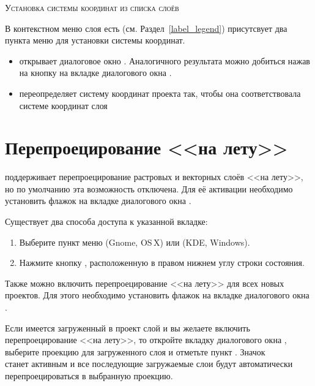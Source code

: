 \begin{Tip}
\caption{\textsc{Установка системы координат из списка слоёв}} В контекстном
меню слоя есть (см. Раздел~\ref{label_legend}) присутсвует два пункта меню
для установки системы координат.
\begin{itemize}
\item {} открывает диалоговое окно
 . Аналогичного результата можно добиться
 нажав на кнопку  на вкладке 
 диалогового окна .
\item {} переопределяет
систему координат проекта так, чтобы она соответствовала системе координат
слоя
\end{itemize}
\end{Tip}

\section{Перепроецирование <<на лету>>}\label{label_projstart}

\qg поддерживает перепроецирование растровых и векторных слоёв <<на лету>>,
но по умолчанию эта возможность отключена. Для её активации необходимо
установить флажок 
на вкладке  диалогового окна .

Существует два способа доступа к указанной вкладке:
\begin{enumerate}
\item Выберите пункт  меню
 (Gnome, OS\,X) или  (KDE,
Windows).
\item Нажмите кнопку , расположенную в
правом нижнем углу строки состояния.
\end{enumerate}

Также можно включить перепроецирование <<на лету>> для всех новых проектов.
Для этого необходимо установить флажок на вкладке  диалогового окна
.

Если имеется загруженный в проект слой и вы желаете включить перепроецирование
<<на лету>>, то откройте вкладку  диалогового окна
, выберите проекцию для загруженного слоя и
отметьте пункт
. Значок \\
 станет активным и все
последующие загружаемые слои будут автоматически перепроецироваться в
выбранную проекцию.


